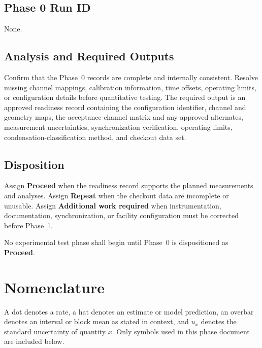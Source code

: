 \documentclass[11pt]{article}
\begin{document}
\subsection{Phase 0 Run ID}
None.

\subsection{Analysis and Required Outputs}

Confirm that the Phase~0 records are complete and internally consistent. Resolve missing channel mappings, calibration information, time offsets, operating limits, or configuration details before quantitative testing. The required output is an approved readiness record containing the configuration identifier, channel and geometry maps, the acceptance-channel matrix and any approved alternates, measurement uncertainties, synchronization verification, operating limits, condensation-classification method, and checkout data set.

\subsection{Disposition}

Assign \textbf{Proceed} when the readiness record supports the planned measurements and analyses. Assign \textbf{Repeat} when the checkout data are incomplete or unusable. Assign \textbf{Additional work required} when instrumentation, documentation, synchronization, or facility configuration must be corrected before Phase~1.

No experimental test phase shall begin until Phase~0 is dispositioned as \textbf{Proceed}.


\clearpage
\appendix
\section{Nomenclature}
\label{sec:nomenclature}
A dot denotes a rate, a hat denotes an estimate or model prediction, an overbar denotes an interval or block mean as stated in context, and $u_x$ denotes the standard uncertainty of quantity $x$. Only symbols used in this phase document are included below.
\end{document}
